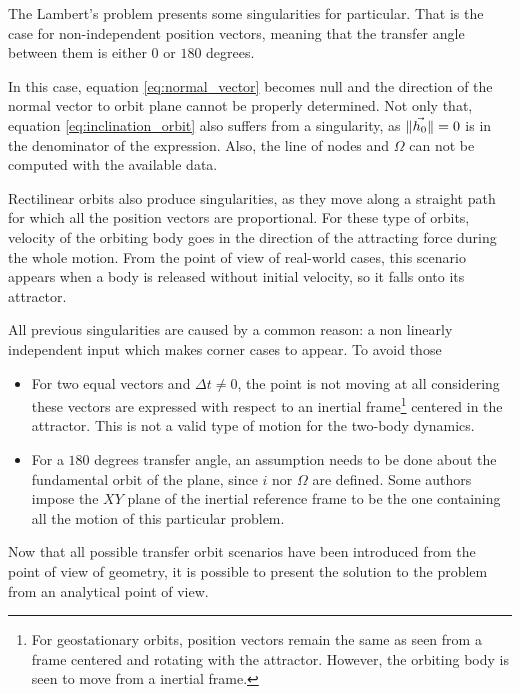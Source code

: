 The Lambert's problem presents some singularities for particular. That is the
case for non-independent position vectors, meaning that the transfer angle
between them is either $0$ or $180$ degrees.

In this case, equation \ref{eq:normal_vector} becomes null and the direction of
the normal vector to orbit plane cannot be properly determined. Not only that,
equation \ref{eq:inclination_orbit} also suffers from a singularity, as
$\lVert\vec{h_{0}}\rVert=0$ is in the denominator of the expression. Also, the line
of nodes and $\Omega$ can not be computed with the available data.

Rectilinear orbits also produce singularities, as they move along a straight
path for which all the position vectors are proportional. For these type of
orbits, velocity of the orbiting body goes in the direction of the
attracting force during the whole motion. From the point of view of real-world
cases, this scenario appears when a body is released without initial velocity,
so it falls onto its attractor.

All previous singularities are caused by a common reason: a non linearly
independent input which makes corner cases to appear. To avoid those

\begin{itemize}
  \item For two equal vectors and $\Delta t \neq 0$, the point is not moving at
	  all considering these vectors are expressed with respect to an
	  inertial frame\footnote{For geostationary orbits, position vectors
	  remain the same as seen from a frame centered and rotating
          with the attractor. However, the orbiting body is seen to move
	  from a inertial frame.} centered in the attractor. This is not a valid
	  type of motion for the two-body dynamics.

  \item For a $180$ degrees transfer angle, an assumption needs to be done about
        the fundamental orbit of the plane, since $i$ nor $\Omega$ are defined.
        Some authors impose the $XY$ plane of the inertial reference frame to be
        the one containing all the motion of this particular problem.
\end{itemize}

Now that all possible transfer orbit scenarios have been introduced from the
point of view of geometry, it is possible to present the solution to the problem
from an analytical point of view.

